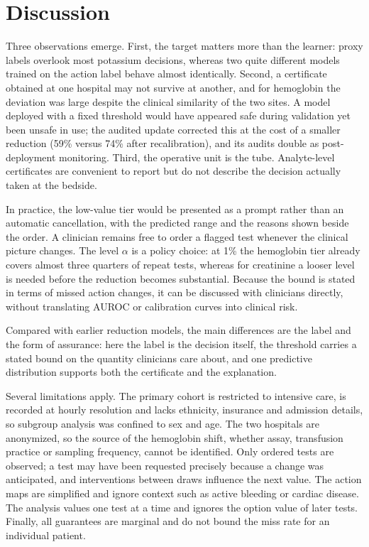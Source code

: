 \documentclass[conference]{IEEEtran}
\begin{document}
\section{Discussion}
Three observations emerge. First, the target matters more than the learner: proxy labels overlook most potassium decisions, whereas two quite different models trained on the action label behave almost identically. Second, a certificate obtained at one hospital may not survive at another, and for hemoglobin the deviation was large despite the clinical similarity of the two sites. A model deployed with a fixed threshold would have appeared safe during validation yet been unsafe in use; the audited update corrected this at the cost of a smaller reduction (59\% versus 74\% after recalibration), and its audits double as post-deployment monitoring. Third, the operative unit is the tube. Analyte-level certificates are convenient to report but do not describe the decision actually taken at the bedside.

In practice, the low-value tier would be presented as a prompt rather than an automatic cancellation, with the predicted range and the reasons shown beside the order. A clinician remains free to order a flagged test whenever the clinical picture changes. The level $\alpha$ is a policy choice: at 1\% the hemoglobin tier already covers almost three quarters of repeat tests, whereas for creatinine a looser level is needed before the reduction becomes substantial. Because the bound is stated in terms of missed action changes, it can be discussed with clinicians directly, without translating AUROC or calibration curves into clinical risk.

Compared with earlier reduction models, the main differences are the label and the form of assurance: here the label is the decision itself, the threshold carries a stated bound on the quantity clinicians care about, and one predictive distribution supports both the certificate and the explanation.

Several limitations apply. The primary cohort is restricted to intensive care, is recorded at hourly resolution and lacks ethnicity, insurance and admission details, so subgroup analysis was confined to sex and age. The two hospitals are anonymized, so the source of the hemoglobin shift, whether assay, transfusion practice or sampling frequency, cannot be identified. Only ordered tests are observed; a test may have been requested precisely because a change was anticipated, and interventions between draws influence the next value. The action maps are simplified and ignore context such as active bleeding or cardiac disease. The analysis values one test at a time and ignores the option value of later tests. Finally, all guarantees are marginal and do not bound the miss rate for an individual patient.
\end{document}
